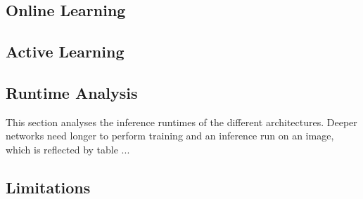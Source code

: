 \subsection{Online Learning} \label{subsection:training_strategies}


\subsection{Active Learning}


\subsection{Runtime Analysis}

This section analyses the inference runtimes of the different architectures. Deeper networks need longer to perform training and an inference run on an image, which is reflected by table ...

\subsection{Limitations}




